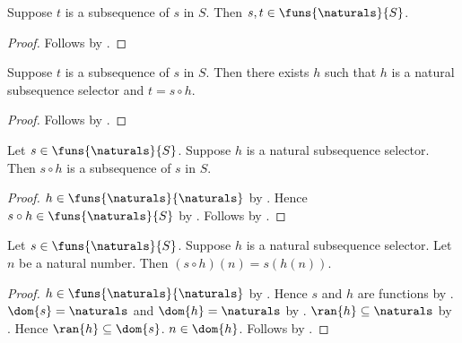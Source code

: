 \begin{proposition}\label{subsequence_types}
    Suppose $t$ is a subsequence of $s$ in $S$.
    Then $s,t\in\funs{\naturals}{S}$.
\end{proposition}
\begin{proof}
    Follows by .
\end{proof}

\begin{proposition}\label{subsequence_selector_exists}
    Suppose $t$ is a subsequence of $s$ in $S$.
    Then there exists $h$ such that
        $h$ is a natural subsequence selector and $t=s\circ h$.
\end{proposition}
\begin{proof}
    Follows by .
\end{proof}

\begin{proposition}\label{subsequence_from_selector}
    Let $s\in\funs{\naturals}{S}$.
    Suppose $h$ is a natural subsequence selector.
    Then $s\circ h$ is a subsequence of $s$ in $S$.
\end{proposition}
\begin{proof}
    $h\in\funs{\naturals}{\naturals}$ by
        .
    Hence $s\circ h\in\funs{\naturals}{S}$ by .
    Follows by .
\end{proof}

\begin{proposition}\label{subsequence_from_selector_apply}
    Let $s\in\funs{\naturals}{S}$.
    Suppose $h$ is a natural subsequence selector.
    Let $n$ be a natural number.
    Then $(s\circ h)(n)=s(h(n))$.
\end{proposition}
\begin{proof}
    $h\in\funs{\naturals}{\naturals}$ by
        .
    Hence $s$ and $h$ are functions by .
    $\dom{s}=\naturals$ and $\dom{h}=\naturals$ by
        .
    $\ran{h}\subseteq\naturals$ by .
    Hence $\ran{h}\subseteq\dom{s}$.
    $n\in\dom{h}$.
    Follows by .
\end{proof}
